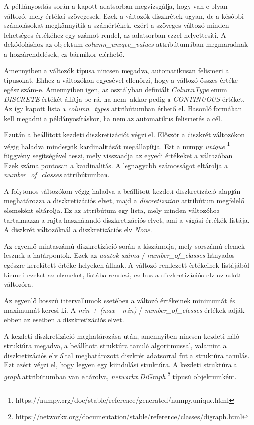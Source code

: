 A példányosítás során a kapott adatsorban megvizsgálja, hogy van-e olyan változó, mely értékei szövegesek. Ezek a változók diszkrétek ugyan, de a későbbi számolásokat megkönnyítik a számértékek, ezért a szöveges változó minden lehetséges értékéhez egy számot rendel, az adatsorban ezzel helyettesíti. A dekódoláshoz az objektum \emph{column\_unique\_values} attribútumában megmaradnak a hozzárendelések, ez bármikor elérhető.

Amennyiben a változók típusa nincsen megadva, automatikusan felismeri a típusokat. Ehhez a változókon egyesével ellenőrzi, hogy a változó összes értéke egész szám-e. Amennyiben igen, az osztályban definiált \emph{ColumnType} enum \emph{DISCRETE} értékét állítja be rá, ha nem, akkor pedig a \emph{CONTINUOUS} értéket. Az így kapott lista a \emph{column\_types} attribútumban érhető el. Hasonló formában kell megadni a példányosításkor, ha nem az automatikus felismerés a cél.

Ezután a beállított kezdeti diszkretizációt végzi el. Először a diszkrét változókon végig haladva mindegyik kardinalitását megállapítja. Ezt a numpy \emph{unique} \footnote{https://numpy.org/doc/stable/reference/generated/numpy.unique.html} függvény segítségével teszi, mely visszaadja az egyedi értékeket a változóban. Ezek száma pontosan a kardinalitás. A legnagyobb számosságot eltárolja a \emph{number\_of\_classes} attribútumban.

A folytonos változókon végig haladva a beállított kezdeti diszkretizáció alapján meghatározza a diszkretizációs elvet, majd a \emph{discretization} attribútum megfelelő elemeként eltárolja. Ez az attribútum egy lista, mely minden változóhoz tartalmazza a rajta használandó diszkretizációs elvet, ami a vágási értékék listája. A diszkrét változóknál a diszkretizációs elv \emph{None}.

Az egyenlő mintaszámú diszkretizáció során a kiszámolja, mely sorszámú elemek lesznek a határpontok. Ezek az \emph{adatok száma} / \emph{number\_of\_classes} hányados egészre kerekített értéke helyeken állnak. A változó rendezett értékeinek listájából kiemeli ezeket az elemeket, listába rendezi, ez lesz a diszkretizációs elv az adott változóra.

Az egyenlő hosszú intervallumok esetében a változó értékeinek minimumát és maximumát keresi ki. A \emph{min + (max - min)} / \emph{number\_of\_classes} értékek adják ebben az esetben a diszkretizációs elvet.

A kezdeti diszkretizáció meghatározása után, amennyiben nincsen kezdeti háló struktúra megadva, a beállított struktúra tanuló algoritmussal, valamint a diszkretizációs elv által meghatározott diszkrét adatsorral fut a struktúra tanulás. Ezt azért végzi el, hogy legyen egy kiindulási struktúra. A kezdeti struktúra a \emph{graph} attribútumban van eltárolva, \emph{networkx.DiGraph} \footnote{https://networkx.org/documentation/stable/reference/classes/digraph.html} típusú objektumként.

